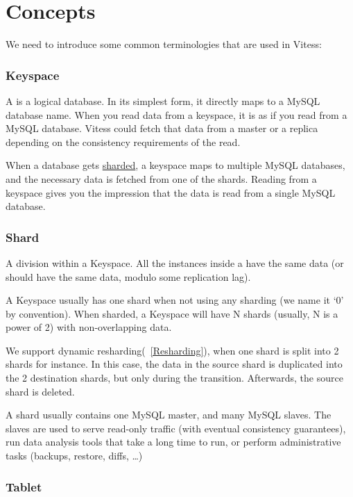 \section{Concepts}\label{Concepts}

We need to introduce some common terminologies that are used in Vitess:

\subsubsection{Keyspace}\label{Keyspace}

A  is a logical database.
In its simplest form, it directly maps to a MySQL database name.
When you read data from a keyspace, it is as if you read from a MySQL database.
Vitess could fetch that data from a master or a replica depending
on the consistency requirements of the read.

When a database gets \href{http://en.wikipedia.org/wiki/Shard\_(database\_architecture)}{sharded}, a keyspace maps to multiple MySQL databases,
and the necessary data is fetched from one of the shards.
Reading from a keyspace gives you the impression that the data is read from
a single MySQL database.

\subsubsection{Shard}\label{shard}

A division within a Keyspace. All the instances inside a  have the same data (or should have the same data,
modulo some replication lag).

A Keyspace usually has one shard when not using any sharding (we name it `0' by convention). When sharded, a Keyspace will have N shards (usually, N is a power of 2) with non-overlapping data.

We support dynamic resharding(~\ref{Resharding}), when one shard is split into 2 shards for instance. In this case, the data in the
source shard is duplicated into the 2 destination shards, but only during the transition. Afterwards, the source shard is
deleted.

A shard usually contains one MySQL master, and many MySQL slaves. The slaves are used to serve read-only traffic (with
eventual consistency guarantees), run data analysis tools that take a long time to run, or perform administrative tasks (backups, restore, diffs, \ldots{})

\subsubsection{Tablet}\hypertarget{tablet}{}\label{tablet}

